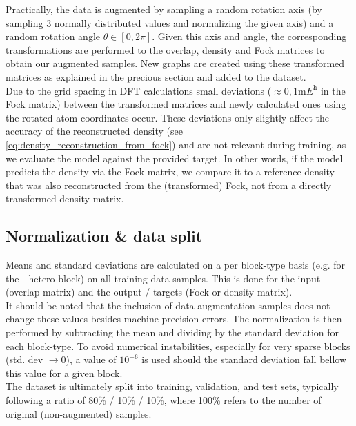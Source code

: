 Practically, the data is augmented by sampling a random rotation axis (by sampling 3 normally distributed values and normalizing the given axis) and a random rotation angle $\theta \in [0, 2\pi]$. Given this axis and angle, the corresponding transformations are performed to the overlap, density and Fock matrices to obtain our augmented samples. New graphs are created using these transformed matrices as explained in the precious section and added to the dataset. \\
Due to the grid spacing in DFT calculations small deviations ($\approx 0,1 \unit{\milli\hartree}$ in the Fock matrix) between the transformed matrices and newly calculated ones using the rotated atom coordinates occur. These deviations only slightly affect the accuracy of the reconstructed density (see \autoref{eq:density_reconstruction_from_fock}) and are not relevant during training, as we evaluate the model against the provided target. In other words, if the model predicts the density via the Fock matrix, we compare it to a reference density that was also reconstructed from the (transformed) Fock, not from a directly transformed density matrix.\\

\subsection{Normalization \& data split}
\label{subsec:gnn_normalization}
Means and standard deviations are calculated on a per block-type basis (e.g. for the - hetero-block) on all training data samples. This is done for the input (overlap matrix) and the output / targets (Fock or density matrix).\\
It should be noted that the inclusion of data augmentation samples does not change these values besides machine precision errors. The normalization is then performed by subtracting the mean and dividing by the standard deviation for each block-type. To avoid numerical instabilities, especially for very sparse blocks (std. dev $\rightarrow 0$), a value of $10^{-6}$ is used should the standard deviation fall bellow this value for a given block. \\

The dataset is ultimately split into training, validation, and test sets, typically following a ratio of 80\% / 10\% / 10\%, where 100\% refers to the number of original (non-augmented) samples.

